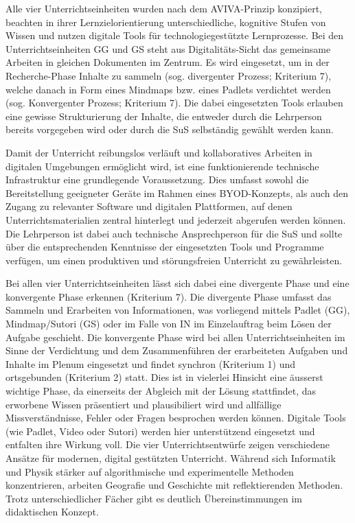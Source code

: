 Alle vier Unterrichtseinheiten wurden nach dem AVIVA-Prinzip konzipiert, beachten in ihrer Lernzielorientierung unterschiedliche, kognitive Stufen von Wissen und nutzen digitale Tools für technologiegestützte Lernprozesse. Bei den Unterrichtseinheiten GG und GS steht aus Digitalitäts-Sicht das gemeinsame Arbeiten in gleichen Dokumenten im Zentrum. Es wird eingesetzt, um in der Recherche-Phase Inhalte zu sammeln (sog. divergenter Prozess; Kriterium 7), welche danach in Form eines Mindmaps bzw. eines Padlets verdichtet werden (sog. Konvergenter Prozess; Kriterium 7). Die dabei eingesetzten Tools erlauben eine gewisse Strukturierung der Inhalte, die entweder durch die Lehrperson bereits vorgegeben wird oder durch die SuS selbständig gewählt werden kann. 

Damit der Unterricht reibungslos verläuft und kollaboratives Arbeiten in digitalen Umgebungen ermöglicht wird, ist eine funktionierende technische Infrastruktur eine grundlegende Voraussetzung. Dies umfasst sowohl die Bereitstellung geeigneter Geräte im Rahmen eines BYOD-Konzepts, als auch den Zugang zu relevanter Software und digitalen Plattformen, auf denen Unterrichtsmaterialien zentral hinterlegt und jederzeit abgerufen werden können. 
Die Lehrperson ist dabei auch technische Ansprechperson für die SuS und sollte über die entsprechenden Kenntnisse der eingesetzten Tools und Programme verfügen, um einen produktiven und störungsfreien Unterricht zu gewährleisten. 

Bei allen vier Unterrichtseinheiten lässt sich dabei eine divergente Phase und eine konvergente Phase erkennen (Kriterium 7). Die divergente Phase umfasst das Sammeln und Erarbeiten von Informationen, was vorliegend mittels Padlet (GG), Mindmap/Sutori (GS) oder im Falle von IN im Einzelauftrag beim Lösen der Aufgabe geschieht. Die konvergente Phase wird bei allen Unterrichtseinheiten im Sinne der Verdichtung und dem Zusammenführen der erarbeiteten Aufgaben und Inhalte im Plenum eingesetzt und findet synchron (Kriterium 1) und ortsgebunden (Kriterium 2) statt. Dies ist in vielerlei Hinsicht eine äusserst wichtige Phase, da einerseits der Abgleich mit der Lösung stattfindet, das erworbene Wissen präsentiert und plausibiliert wird und allfällige Missverständnisse, Fehler oder Fragen besprochen werden können. Digitale Tools (wie Padlet, Video oder Sutori) werden hier unterstützend eingesetzt und entfalten ihre Wirkung voll.  
Die vier Unterrichtsentwürfe zeigen verschiedene Ansätze für modernen, digital gestützten Unterricht. Während sich Informatik und Physik stärker auf algorithmische und experimentelle Methoden konzentrieren, arbeiten Geografie und Geschichte mit reflektierenden Methoden. Trotz unterschiedlicher Fächer gibt es deutlich Übereinstimmungen im didaktischen Konzept.
